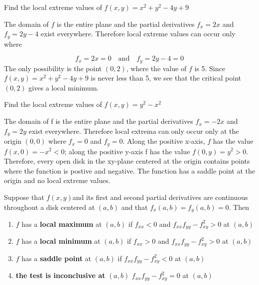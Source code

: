 \documentclass[12pt,a4paper,draft]{article}
\newenvironment{theorem}{\begin{theorembox}}{\end{theorembox}\vspace{1\baselineskip}}
\newcommand{\fxy}{\(f(x,y)\)}
\begin{document}
\begin{example}
    Find the local extreme values of \(f(x,y) = x^2 + y^2 -4y +9\)
\end{example}

\begin{solution}
    The domain of \(f\) is the entire plane and the partial derivatives \(f_x = 2x\) and \(f_y = 2y -4\) exist everywhere. Therefore local extreme values can occur only where

    \[f_x = 2x = 0 \quad \text{and} \quad f_y = 2y-4 = 0\] 
    The only possibility is the point \((0,2)\), where the value of \(f\) is 5. Since \(f(x,y) = x^2 + y^2 -4y +9\)  is never less than 5, we see that the critical point \((0,2)\) gives a local minimum.

\end{solution}

\begin{example}
    Find the local extreme values of \(f(x,y) = y^2 - x^2\)

    \begin{solution}
        The domain of f is the entire plane and the partial derivatives \(f_x = -2x\) and \(f_y = 2y\) exist everywhere. Therefore local extrema can only occur only at the origin \((0,0)\) where \(f_x = 0\) and \(f_y = 0\).
        Along the positive x-axis, \(f\) has the value \(f(x,0) = -x^2 < 0\); along the positive y-axis f has the value \(f(0,y) = y^2 > 0\). Therefore, every open disk in the xy-plane centered at the origin contains points where the function is postive and negative. The function has a saddle point at the origin and no local extreme values.
    \end{solution}

\end{example}

\begin{theorem}
    Suppose that \fxy and its first and second partial derivatives are continuous throughout a disk centered at \((a,b)\) and that \(f_x(a,b) = f_y(a,b)=0\). Then
    \begin{enumerate}
        \item \(f\) has a \textbf{local maximum} at \((a,b)\) if \(f_{xx} < 0\) and \(f_{xx}f_{yy}-f_{xy}^2 > 0\) at \((a,b)\)
        \item \(f\) has a \textbf{local minimum} at \((a,b)\) if \(f_{xx} > 0\) and \(f_{xx}f_{yy}-f_{xy}^2 > 0\) at \((a,b)\)
        \item \(f\) has a \textbf{saddle point} at \((a,b)\) if  \(f_{xx}f_{yy}-f_{xy}^2 < 0\) at \((a,b)\)
        \item \textbf{the test is inconclusive at}  \((a,b)\) \(f_{xx}f_{yy}-f_{xy}^2 = 0\) at \((a,b)\)
    \end{enumerate}
\end{theorem}
\end{document}
